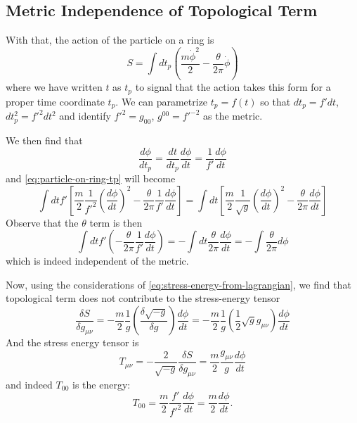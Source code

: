 \documentclass{report}
\begin{document}
\subsection{Metric Independence of Topological Term}

With that, the action of the particle on a ring is 
\begin{equation}\label{eq:particle-on-ring-tp}
	S = \int dt_p \left(
		\frac{m\dot{\phi}^2}{2} - \frac{\theta}{2\pi} \dot{\phi}
	\right)
\end{equation}
where we have written $ t $ as $ t_p $ to signal that the action takes this form 
for a proper time coordinate $ t_p $. We can parametrize $ t_p = f(t) $ so that  
$ dt_p = f'dt  $, $ dt^2_p = f'^2 dt^2 $ and identify $ f'^2  =g_00 $, 
$ g^00 = f'^{-2} $ as the metric.  

We then find that 
\begin{equation*}
	\frac{d\phi}{dt_p} = \frac{dt}{dt_p} \frac{d\phi}{dt} = \frac{1}{f'}
		\frac{d\phi}{dt}
\end{equation*}
and \cref{eq:particle-on-ring-tp} will become 
\begin{equation*}
	\int dt f' \left[
		\frac{m}{2}\frac{1}{f'^2} \left(\frac{d \phi}{d t}\right)^2
		 - \frac{\theta}{2\pi} \frac{1}{f'} \frac{d \phi}{dt}
	\right]
	=
	\int dt \left[
		\frac{m}{2}\frac{1}{\sqrt{g}} \left(\frac{d \phi}{d t}\right)^2
		 - \frac{\theta}{2\pi} \frac{d \phi}{dt}
	\right]
\end{equation*}
Observe that the $ \theta $ term is then 
\begin{equation*}
	\int dt f'\left(
		- \frac{\theta}{2\pi} \frac{1}{f'} \frac{d \phi}{dt}
	\right)
	= -\int dt \frac{\theta}{2\pi} \frac{d \phi}{dt}
	= - \int \frac{\theta}{2\pi} d\phi
\end{equation*}
which is indeed independent of the metric.

Now, using the considerations of \cref{eq:stress-energy-from-lagrangian}, we 
find that topological term does not contribute to the stress-energy tensor
\begin{equation*}
	\frac{\delta S}{\delta g_{\mu\nu}}
		= - \frac{m}{2} \frac{1}{g} \left(\frac{\delta \sqrt{-g}}{\delta g}\right)
			\frac{d \phi}{dt}
		= - \frac{m}{2}\frac{1}{g}\left(\frac{1}{2}\sqrt{g}g_{\mu\nu}\right)
			\frac{d \phi}{dt}
\end{equation*}
And the stress energy tensor is 
\begin{equation*}
	T_{\mu\nu}
		= - \frac{2}{\sqrt{-g}} \frac{\delta S}{\delta g_{\mu\nu}}
			= \frac{m}{2} \frac{g_{\mu\nu}}{g} \frac{d \phi}{dt}
\end{equation*}
and indeed $ T_{00} $ is the energy: 
\begin{equation*}
	T_{00} = \frac{m}{2} \frac{f'}{f'^2} \frac{d \phi}{dt}
		= \frac{m}{2} \frac{d \phi}{dt}.
\end{equation*}
\end{document}
